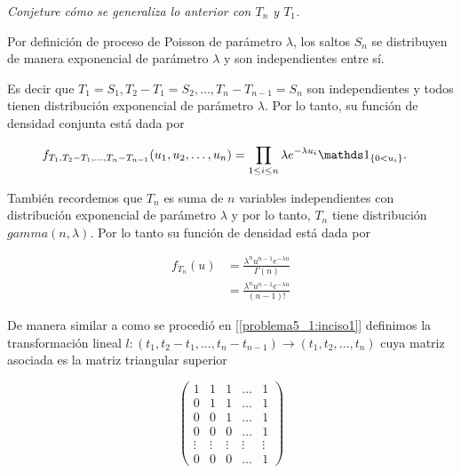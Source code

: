 \emph{
	Conjeture c\'omo se  generaliza lo anterior con $T_n$ y $T_1$.
}

Por definición de proceso de Poisson de parámetro $\lambda$, los saltos $S_n$ se distribuyen
de manera exponencial de parámetro $\lambda$ y son independientes entre sí.\pn

Es decir que $T_1 = S_1, T_2 - T_1 = S_2, \dots, T_n - T_{n-1} = S_n$ son independientes y 
todos tienen distribución exponencial de parámetro $\lambda$. Por lo tanto, su función
de densidad conjunta está dada por

\begin{align} \label{problema5_1:distribucion_conjunta}
    f_{T_1, T_2 - T_1, \dots, T_n - T_{n-1}}(u_1, u_2, \dots, u_n)  &=  
    \prod_{1 \leq i \leq n} \lambda e^{-\lambda u_i} \indic_{\{ 0 < u_i \}}. 
\end{align}\pn

También recordemos que $T_n$ es suma de $n$ variables independientes con distribución exponencial de
parámetro $\lambda$ y por lo tanto, $T_n$ tiene distribución $gamma(n, \lambda)$. Por lo tanto su 
función de densidad está dada por

\begin{align}
    f_{T_n}(u)  &=  \frac{ \lambda^{n} u^{n-1} e^{- \lambda u}}{\Gamma(n)} \\
                &=  \frac{ \lambda^{n} u^{n-1} e^{- \lambda u}}{(n-1)!}
\end{align}\pn

De manera similar a como se procedió en [\ref{problema5_1:inciso1}] definimos la transformación lineal 
$l: (t_1, t_2 - t_1, \dots, t_n - t_{n-1}) \longrightarrow (t_1, t_2, \dots, t_n)$ cuya matriz asociada es la 
matriz triangular superior

\[
    \left(
            \begin{array}{ccccc}
                    1       &   1       & 1      &\dots   &  1      \\
                    0       &   1       & 1      &\dots   &  1      \\
                    0       &   0       & 1      &\dots   &  1      \\
                    0       &   0       & 0      &\dots   &  1      \\
                    \vdots  &   \vdots  & \vdots &\vdots  & \vdots  \\
                    0       &   0       & 0      &\dots   &  1
            \end{array}
    \right)
\]\pn

